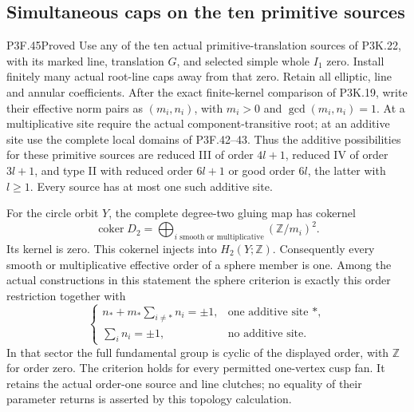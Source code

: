 \subsection{Simultaneous caps on the ten primitive sources}
\begin{statement}{P3F.45}{Proved}
Use any of the ten actual primitive-translation sources of P3K.22,
with its marked line, translation $G$, and selected simple whole
$I_1$ zero. Install finitely many actual root-line caps away from
that zero. Retain all elliptic, line and annular coefficients.
After the exact finite-kernel comparison of P3K.19, write their
effective norm pairs as $(m_i,n_i)$, with $m_i>0$ and
$\gcd(m_i,n_i)=1$.
At a multiplicative site require the actual component-transitive
root; at an additive site use the complete local domains of
P3F.42--43. Thus the additive possibilities for these primitive
sources are reduced III of order $4l+1$, reduced IV of order
$3l+1$, and type II with reduced order $6l+1$ or good order
$6l$, the latter with $l\geq1$. Every source has at most one
such additive site.

For the circle orbit $Y$, the complete degree-two gluing map has
cokernel
\[
 \operatorname{coker}D_2
   =\bigoplus_{i\text{ smooth or multiplicative}}
                         (\mathbb Z/m_i)^2.             \tag{F45.1}
\]
Its kernel is zero. This cokernel injects into $H_2(Y;\mathbb Z)$.
Consequently every smooth or multiplicative effective order of a
sphere member is one. Among the actual constructions in this
statement the sphere criterion is exactly this order restriction
together with
\[
 \begin{cases}
 n_*+m_*\displaystyle\sum_{i\ne *}n_i=\pm1,
                         &\text{one additive site }*,\\[2mm]
 \displaystyle\sum_i n_i=\pm1,
                         &\text{no additive site}.
 \end{cases}                                           \tag{F45.2}
\]
In that sector the full fundamental group is cyclic of the
displayed order, with $\mathbb Z$ for order zero. The criterion
holds for every permitted one-vertex cusp fan. It retains the
actual order-one source and line clutches; no equality of their
parameter returns is asserted by this topology calculation.
\end{statement}
